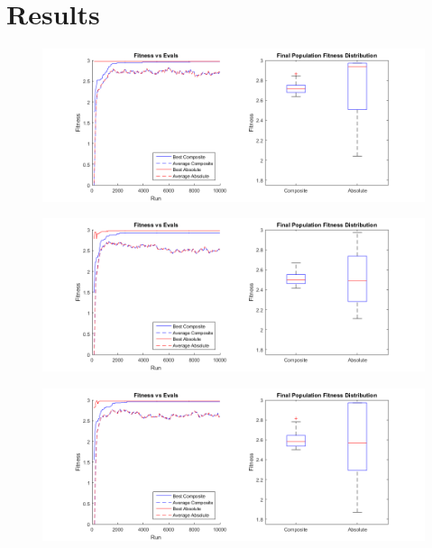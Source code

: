 \documentclass[11pt]{article}
\begin{document}
\section{Results}\label{sect:results}
\begin{figure}[ht]
\centering
\includegraphics[width=6in]{default.png}
\label{fig:default}
\end{figure}
\begin{figure}[ht]
\centering
\includegraphics[width=6in]{high_mut.png}
\label{fig:high_mut}
\end{figure}
\begin{figure}[ht]
\centering
\includegraphics[width=6in]{no_mut.png}
\label{fig:no_mut}
\end{figure}
\end{document}
